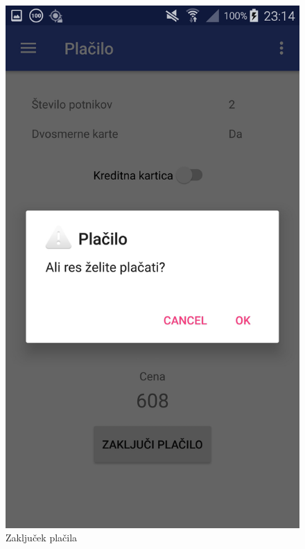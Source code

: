 \documentclass[11pt,a4paper]{article}
\begin{document}
\begin{figure}[htb]
	\centerline{\includegraphics[width=1.0\textwidth]{GUI/zakljucekPlacila.jpg}}
	\caption{Zaključek plačila}
	\label{sl:koncept}
\end{figure}
\end{document}
